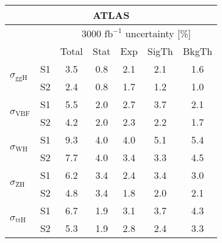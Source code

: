 \begin{tabular}{@{} l c c@{\hskip 0.15in} c c c c @{}}
  \hline
   \multicolumn{7}{c}{ATLAS}\\
 \hline  
  &  & \multicolumn{5}{c}{3000 $\text{fb}^{-1}$ uncertainty [\%]} \\
  &  & Total & Stat & Exp & SigTh & BkgTh \\
  \hline
  \multirow{2}{*}{$\sigma_{\mathrm{ggH}}$} & S1 &3.5   & 0.8   & 2.1   & 2.1   & 1.6  \\[1pt]
  & S2 &2.4   & 0.8   & 1.7   & 1.2   & 1.0  \\[4pt]
  \multirow{2}{*}{$\sigma_{\mathrm{VBF}}$} & S1 &5.5   & 2.0   & 2.7   & 3.7   & 2.1  \\[1pt]
  & S2 &4.2   & 2.0   & 2.3   & 2.2   & 1.7  \\[4pt]
  \multirow{2}{*}{$\sigma_{\mathrm{WH}}$} & S1 &9.3   & 4.0   & 4.0   & 5.1   & 5.4  \\[1pt]
  & S2 &7.7   & 4.0   & 3.4   & 3.3   & 4.5  \\[4pt]
  \multirow{2}{*}{$\sigma_{\mathrm{ZH}}$} & S1 &6.2   & 3.4   & 2.4   & 3.4   & 3.0  \\[1pt]
  & S2 &4.8   & 3.4   & 1.8   & 2.0   & 2.1  \\[4pt]
  \multirow{2}{*}{$\sigma_{\mathrm{ttH}}$} & S1 &6.7   & 1.9   & 3.1   & 3.7   & 4.3  \\[1pt]
  & S2 &5.3   & 1.9   & 2.8   & 2.4   & 3.3  \\[4pt]
  \hline
\end{tabular}
